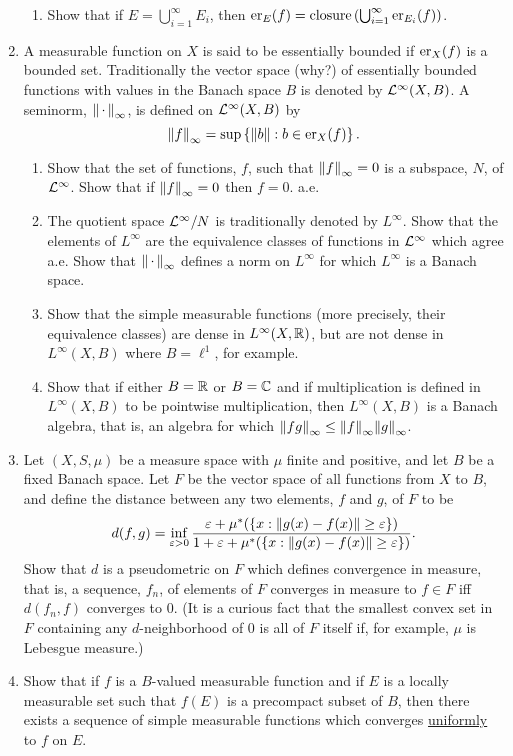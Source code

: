 \begin{enumerate}[label=\arabic*),ref=\arabic*]
\begin{enumerate}
    \item Show that if $E=\bigcup_{i=1}^\infty E_i$, then $\er{f}{E}=\text{closure}\br{\bigcup_{i=1}^\infty\er{f}{E_i}}$.
\end{enumerate}

\item \label{exer:essentially bounded}
A measurable function on $X$ is said to be essentially bounded if $\er{f}{X}$ is a bounded set. Traditionally the vector space (why?) of essentially bounded functions with values in the Banach space $B$ is denoted by $\cL^\infty(X, B)$. A seminorm, $\norm{\imarg}_\infty$, is defined on $\cL^\infty(X, B)$ by $$\norm{f}_\infty=\sup\brc{\norm{b}: b\in\er{f}{X}}.$$
\begin{enumerate}
    \item Show that the set of functions, $f$, such that $\norm{f}_\infty=0$ is a subspace, $N$, of $\cL^\infty$. Show that if $\norm{f}_\infty=0$ then $f=0$. a.e.
    
    \item The quotient space $\cL^\infty/N$ is traditionally denoted by $L^\infty$. Show that the elements of $L^\infty$ are the equivalence classes of functions in $\cL^\infty$ which agree a.e. Show that $\norm{\imarg}_\infty$ defines a norm on $L^\infty$ for which $L^\infty$ is a Banach space.

    \item Show that the simple measurable functions (more precisely, their equivalence classes) are dense in $L^\infty(X,\bR)$, but are not dense in $L^\infty(X, B)$ where $B=\ell^1$, for example.

    \item Show that if either $B=\bR$ or $B=\bC$ and if multiplication is defined in $L^\infty(X, B)$ to be pointwise multiplication, then $L^\infty(X, B)$ is a Banach algebra, that is, an algebra for which $\norm{fg}_\infty\leq\norm{f}_\infty\norm{g}_\infty$.
\end{enumerate}

\item Let $(X, S, \mu)$ be a measure space with $\mu$ finite and positive, and let $B$ be a fixed Banach space. Let $F$ be the vector space of all functions from $X$ to $B$, and define the distance between any two elements, $f$ and $g$, of $F$ to be $$d(f,g)=\inf_{\ep>0}\frac{\ep+\mu^*(\brc{x:\norm{g(x)-f(x)}\geq\ep})}{1+\ep+\mu^*(\brc{x:\norm{g(x)-f(x)}\geq\ep})}.$$
Show that $d$ is a pseudometric on $F$ which defines convergence in measure, that is, a sequence, $f_n$, of elements of $F$ converges in measure to $f \in F$ iff $d(f_n, f)$ converges to 0. (It is a curious fact that the smallest convex set in $F$ containing any $d$-neighborhood of 0 is all of $F$ itself if, for example, $\mu$ is Lebesgue measure.)

\item \label{exer:precpct range seq of simple func}
Show that if $f$ is a $B$-valued measurable function and if $E$ is a locally measurable set such that $f(E)$ is a precompact subset of $B$, then there exists a sequence of simple measurable functions which converges \underline{uniformly} to $f$ on $E$.
\end{enumerate}